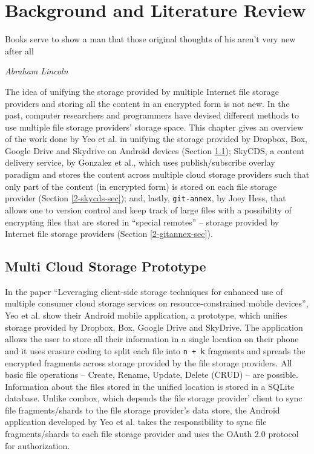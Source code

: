 \chapter{Background and Literature Review}

\epigraph{Books serve to show a man that those original thoughts of
  his aren't very new after all}{\textit{Abraham Lincoln}}

The idea of unifying the storage provided by multiple Internet file
storage providers and storing all the content in an encrypted form is
not new. In the past, computer researchers and programmers have devised different
methods to use multiple file storage providers' storage space. This
chapter gives an overview of the work done by Yeo et al. in unifying
the storage provided by Dropbox, Box, Google Drive and Skydrive on
Android devices \cite{yeo}(Section \ref{2-yeo-sec}); SkyCDS, a content
delivery service, by Gonzalez et al., which uses publish/subscribe
overlay paradigm and stores the content across multiple cloud storage
providers such that only part of the content (in encrypted form) is
stored on each file storage provider \cite{skycds}(Section
\ref{2-skycds-sec}); and, lastly, \verb+git-annex+, by Joey
Hess\cite{person:joeyh}, that allows one to version control and keep
track of large files with a possibility of encrypting files that are
stored in ``special remotes'' -- storage provided by Internet file
storage providers (Section \ref{2-gitannex-sec}).

\section{Multi Cloud Storage Prototype}\label{2-yeo-sec}

In the paper ``Leveraging client-side storage techniques for
enhanced use of multiple consumer cloud storage services on
resource-constrained mobile devices'', Yeo et al. show their Android
mobile application, a prototype, which unifies storage provided by
Dropbox, Box, Google Drive and SkyDrive. The application allows the
user to store all their information in a single location on their
phone and it uses erasure coding \cite{weatherspoon} to split each file
into \verb`n + k` fragments and spreads the encrypted fragments across
storage provided by the file storage providers. All basic file
operations -- Create, Rename, Update, Delete (CRUD) -- are
possible. Information about the files stored in the unified location
is stored in a SQLite database. Unlike combox, which depends the file
storage provider' client to sync file fragments/shards to the file
storage provider's data store, the Android application developed by
Yeo et al. takes the responsibility to sync file fragments/shards to
each file storage provider and uses the OAuth
2.0\cite{protocol:oauth2} protocol for authorization.

